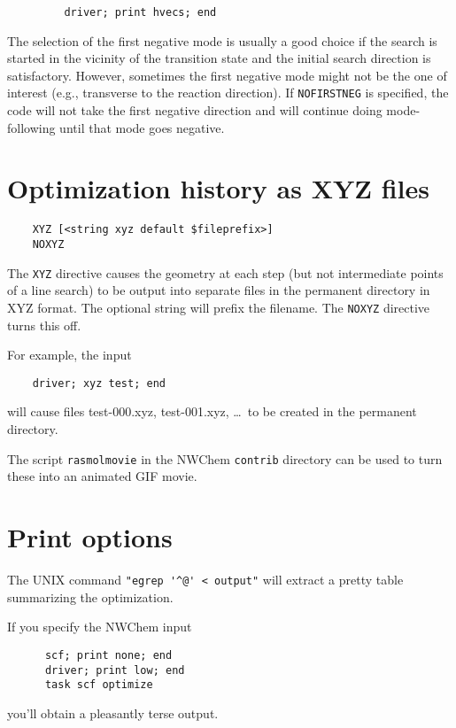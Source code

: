 \begin{verbatim}
         driver; print hvecs; end
\end{verbatim}

The selection of the first negative mode is usually a good choice if
the search is started in the vicinity of the transition state and the
initial search direction is satisfactory.  However, sometimes the
first negative mode might not be the one of interest (e.g., transverse
to the reaction direction).  If \verb+NOFIRSTNEG+ is specified, the
code will not take the first negative direction and will continue doing
mode-following until that mode goes negative.

\section{Optimization history as XYZ files}

\begin{verbatim}
    XYZ [<string xyz default $fileprefix>]
    NOXYZ
\end{verbatim}

The \verb+XYZ+ directive causes the geometry at each step (but not
intermediate points of a line search) to be output into separate files
in the permanent directory in XYZ format.  The optional string will
prefix the filename.  The \verb+NOXYZ+ directive turns this off.

For example, the input
\begin{verbatim}
    driver; xyz test; end
\end{verbatim}
will cause files test-000.xyz, test-001.xyz, \ldots\ to be created
in the permanent directory.  

The script \verb+rasmolmovie+ in the NWChem \verb+contrib+ directory
can be used to turn these into an animated GIF movie.

\section{Print options}

The UNIX command \verb+"egrep '^@' < output"+ will extract a pretty
table summarizing the optimization.

If you specify the NWChem input
\begin{verbatim}
      scf; print none; end
      driver; print low; end
      task scf optimize
\end{verbatim}
you'll obtain a pleasantly terse output.

